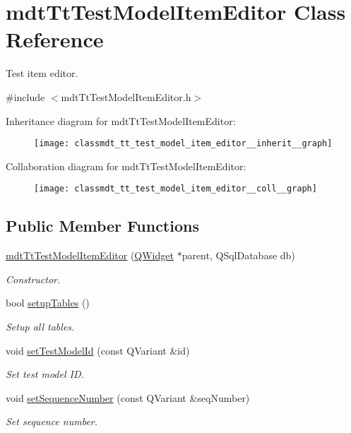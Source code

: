 \hypertarget{classmdt_tt_test_model_item_editor}{\section{mdt\-Tt\-Test\-Model\-Item\-Editor Class Reference}
\label{classmdt_tt_test_model_item_editor}
}


Test item editor.  




{\ttfamily \#include $<$mdt\-Tt\-Test\-Model\-Item\-Editor.\-h$>$}



Inheritance diagram for mdt\-Tt\-Test\-Model\-Item\-Editor\-:\nopagebreak
\begin{figure}[H]
\begin{center}
\leavevmode
\texttt{[image: classmdt\_tt\_test\_model\_item\_editor\_\_inherit\_\_graph]}
\end{center}
\end{figure}


Collaboration diagram for mdt\-Tt\-Test\-Model\-Item\-Editor\-:\nopagebreak
\begin{figure}[H]
\begin{center}
\leavevmode
\texttt{[image: classmdt\_tt\_test\_model\_item\_editor\_\_coll\_\_graph]}
\end{center}
\end{figure}
\subsection*{Public Member Functions}
\begin{DoxyCompactItemize}
\item 
\hyperlink{classmdt_tt_test_model_item_editor_aad5b5dd51ec572e453a10bdaa22f91a8}{mdt\-Tt\-Test\-Model\-Item\-Editor} (\hyperlink{class_q_widget}{Q\-Widget} $\ast$parent, Q\-Sql\-Database db)
\begin{DoxyCompactList}\small\item\em Constructor. \end{DoxyCompactList}\item 
bool \hyperlink{classmdt_tt_test_model_item_editor_a1281b469c8d9493e2ce97923c7ce9b33}{setup\-Tables} ()
\begin{DoxyCompactList}\small\item\em Setup all tables. \end{DoxyCompactList}\item 
void \hyperlink{classmdt_tt_test_model_item_editor_a2e62312a7ae3887880d24bb819b33665}{set\-Test\-Model\-Id} (const Q\-Variant \&id)
\begin{DoxyCompactList}\small\item\em Set test model I\-D. \end{DoxyCompactList}\item 
void \hyperlink{classmdt_tt_test_model_item_editor_a93f43c103987bd26068566420ac4eaa2}{set\-Sequence\-Number} (const Q\-Variant \&seq\-Number)
\begin{DoxyCompactList}\small\item\em Set sequence number. \end{DoxyCompactList}\end{DoxyCompactItemize}
